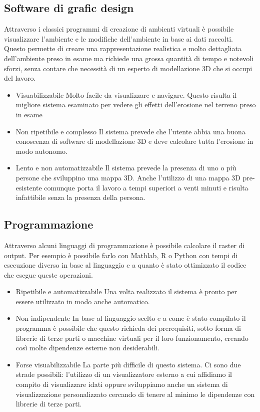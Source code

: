 \subsection{Software di grafic design}
Attraverso i classici programmi di creazione di ambienti virtuali è possibile visualizzare l'ambiente e le modifiche dell'ambiente in base ai dati raccolti. Questo permette di creare una rappresentazione realistica e molto dettagliata dell'ambiente preso in esame ma richiede una grossa quantità di tempo e notevoli sforzi, senza contare che necessità di un esperto di modellazione 3D che si occupi del lavoro.

\begin{itemize}
	\item{Visuabilizzabile} Molto facile da visualizzare e navigare. Questo risulta il migliore sistema esaminato per vedere gli effetti dell'erosione nel terreno preso in esame

	\item{Non ripetibile e complesso} Il sistema prevede che l'utente abbia una buona conoscenza di software di modellazione 3D e deve calcolare tutta l'erosione in modo autonomo.

	\item{Lento e non automatizzabile} Il sistema prevede la presenza di uno o più persone che sviluppino una mappa 3D. Anche l'utilizzo di una mappa 3D pre-esistente comunque porta il lavoro a tempi superiori a venti minuti e risulta infattibile senza la presenza della persona.
\end{itemize}



\subsection{Programmazione}
Attraverso alcuni linguaggi di programmazione è possibile calcolare il raster di output. Per esempio è possibile farlo con Mathlab, R o Python con tempi di esecuzione diverso in base al linguaggio e a quanto è stato ottimizzato il codice che esegue queste operazioni.

\begin{itemize}
	\item{Ripetibile e automatizzabile} Una volta realizzato il sistema è pronto per essere utilizzato in modo anche automatico.

	\item{Non indipendente} In base al linguaggio scelto e a come è stato compilato il programma è possibile che questo richieda dei prerequisiti, sotto forma di librerie di terze parti o macchine virtuali per il loro funzionamento, creando così molte dipendenze esterne non desiderabili.

	\item{Forse visuabilizzabile} La parte più difficile di questo sistema. Ci sono due strade possibili: l'utilizzo di un visualizzatore esterno a cui affidiamo il compito di visualizzare idati oppure sviluppiamo anche un sistema di visualizzazione personalizzato cercando di tenere al minimo le dipendenze con librerie di terze parti.
\end{itemize}

